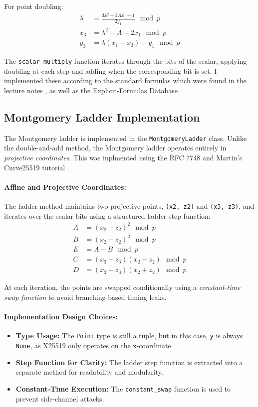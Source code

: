 \documentclass[twoside,a4paper,12pt]{article}
\begin{document}
For point doubling:
\begin{align}
    \lambda &= \frac{3x_1^2 + 2Ax_1 + 1}{2y_1} \mod p \\
    x_3 &= \lambda^2 - A - 2x_1 \mod p \\
    y_3 &= \lambda (x_1 - x_3) - y_1 \mod p
\end{align}

The \texttt{scalar\_multiply} function iterates through the bits of the scalar, applying doubling at each step and adding when the corresponding bit is set. I implemented these according to the standard formulas which were found in the lecture notes \cite{P79LectureNotes}, as well as the Explicit-Formulas Database \cite{hyperellipticEFDMG}.

\subsection{Montgomery Ladder Implementation}
\label{subsec:x25519_montgomery_ladder}

The Montgomery ladder is implemented in the \texttt{MontgomeryLadder} class. Unlike the double-and-add method, the Montgomery ladder operates entirely in \textit{projective coordinates}. This was inplmented using the RFC
7748 \cite{rfc7748} and Martin's Curve25519 tutorial \cite{Kleppmann2020}.
\paragraph{Affine and Projective Coordinates:} The ladder method maintains two projective points, \texttt{(x2, z2)} and \texttt{(x3, z3)}, and iterates over the scalar bits using a structured ladder step function:
\begin{align}
    A &= (x_2 + z_2)^2 \mod p \\
    B &= (x_2 - z_2)^2 \mod p \\
    E &= A - B \mod p \\
    C &= (x_3 + z_3) (x_2 - z_2) \mod p \\
    D &= (x_3 - z_3) (x_2 + z_2) \mod p
\end{align}

At each iteration, the points are swapped conditionally using a \textit{constant-time swap function} to avoid branching-based timing leaks.

\paragraph{Implementation Design Choices:}
\begin{itemize}
    \item \textbf{Type Usage:} The \texttt{Point} type is still a tuple, but in this case, \texttt{y} is always \texttt{None}, as X25519 only operates on the x-coordinate.
    \item \textbf{Step Function for Clarity:} The ladder step function is extracted into a separate method for readability and modularity.
    \item \textbf{Constant-Time Execution:} The \texttt{constant\_swap} function is used to prevent side-channel attacks.
\end{itemize}
\end{document}
